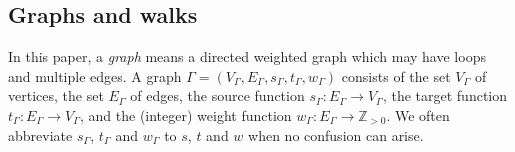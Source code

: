 \documentclass[10pt,a4paper]{amsart}
\theoremstyle{plain}
\theoremstyle{definition}
\theoremstyle{remark}
\begin{document}
\setcounter{subsection}{1}
\subsection{Graphs and walks}\label{subsection:GandW}

In this paper, a \textit{graph} means a directed weighted graph which may have loops and multiple edges. 
A graph $\Gamma = (V_{\Gamma}, E_{\Gamma}, s_{\Gamma}, t_{\Gamma}, w_{\Gamma})$ 
consists of the set $V_{\Gamma}$ of vertices, the set $E_{\Gamma}$ of edges, 
the source function $s_{\Gamma}: E_{\Gamma} \to V_{\Gamma}$, 
the target function $t_{\Gamma}: E_{\Gamma} \to V_{\Gamma}$, and 
the (integer) weight function $w_{\Gamma}: E_{\Gamma} \to \mathbb{Z}_{> 0}$. 
We often abbreviate $s_{\Gamma}$, $t_{\Gamma}$ and $w_{\Gamma}$ to $s$, $t$ and $w$ 
when no confusion can arise. 
\end{document}
